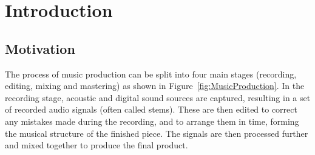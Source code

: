 \chapter{Introduction}
\label{chap:Introduction}

\section{Motivation}
\label{sec:Introduction-Motivation}
	The process of music production can be split into four main stages (recording, editing, mixing and mastering) as
	shown in Figure~\ref{fig:MusicProduction}. In the recording stage, acoustic and digital sound sources are captured,
	resulting in a set of recorded audio signals (often called stems). These are then edited to correct any mistakes
	made during the recording, and to arrange them in time, forming the musical structure of the finished piece. The
	signals are then processed further and mixed together to produce the final product.

